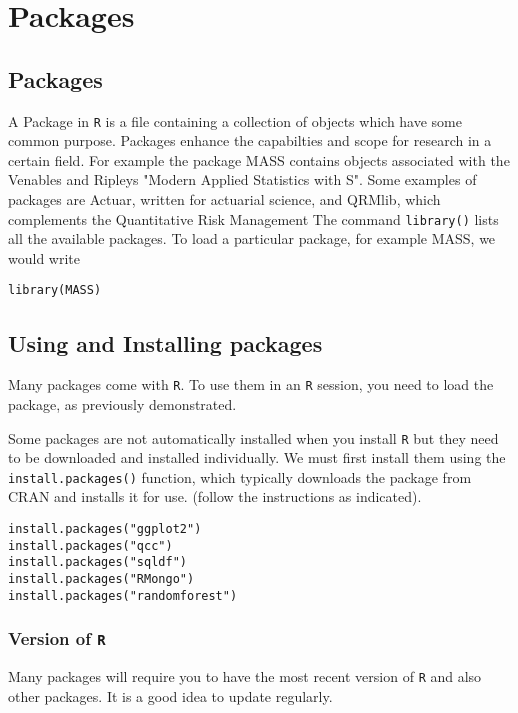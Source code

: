 \documentclass[a4paper,12pt]{article}
\begin{document}
\section{Packages}
%
%

\subsection{Packages}

A Package in \texttt{R} is a file containing a collection of objects which have some common purpose. Packages enhance the capabilties and scope for research in a certain field.
For example the package MASS contains objects associated with the Venables and Ripleys "Modern Applied
Statistics with S". 
Some examples of packages are Actuar, written for actuarial science, and QRMlib, which complements the Quantitative Risk Management
The command \texttt{library()} lists all the available packages. To load a particular package, for example MASS, we would write
\begin{verbatim}
library(MASS)
\end{verbatim}

\subsection{Using and Installing packages}

Many packages come with \texttt{R}. To use them in an \texttt{R} session, you need to load the package, as previously demonstrated.

Some packages are not automatically installed when you install \texttt{R} but they need to be downloaded and installed individually.
We must first install them using the \texttt{install.packages()} function, which typically downloads the package from CRAN and installs it for use. (follow the instructions as indicated).
\begin{verbatim}
install.packages("ggplot2")
install.packages("qcc")
install.packages("sqldf")
install.packages("RMongo")
install.packages("randomforest")
\end{verbatim}

\subsubsection{Version of \texttt{R}}
Many packages will require you to have the most recent version of \texttt{R} and also other packages. It is a good idea to update regularly.
\end{document}
